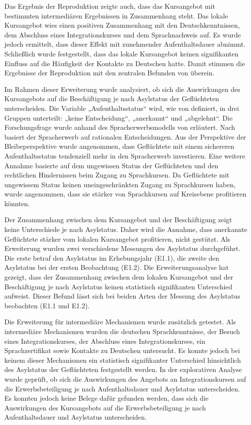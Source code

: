  Das Ergebnis der Reproduktion zeigte auch, dass das Kursangebot mit bestimmten intermediären Ergebnissen in Zusammenhang steht. Das lokale Kursangebot wies einen positiven Zusammenhang mit den Deutschkenntnissen, dem Abschluss eines Integrationskurses und dem Sprachnachweis auf. Es wurde jedoch ermittelt, dass dieser Effekt mit zunehmender Aufenthaltsdauer abnimmt. Schließlich wurde festgestellt, dass das lokale Kursangebot keinen signifikanten Einfluss auf die Häufigkeit der Kontakte zu Deutschen hatte. Damit stimmen die Ergebnisse der Reproduktion mit den zentralen Befunden von \textcite{Kanas:2023} überein.
 
 Im Rahmen dieser Erweiterung wurde analysiert, ob sich die Auswirkungen des Kursangebots auf die Beschäftigung je nach Asylstatus der Geflüchteten unterscheiden. Die Variable „Aufenthaltsstatus“ wird, wie von \textcite{Kanas:2023} definiert, in drei Gruppen unterteilt: „keine Entscheidung“, „anerkannt“ und „abgelehnt“. Die Forschungsfrage wurde anhand des Spracherwerbsmodells von \textcite{Esser:2006} erläutert. Nach \textcite{Esser:2006} basiert der Spracherwerb auf rationalen Entscheidungen. Aus der Perspektive der Bleibeperspektive wurde angenommen, dass Geflüchtete mit einem sichereren Aufenthaltsstatus tendenziell mehr in den Spracherwerb investieren. Eine weitere Annahme basierte auf dem ungewissen Status der Geflüchteten und den rechtlichen Hindernissen beim Zugang zu Sprachkursen. Da Geflüchtete mit ungewissem Status keinen uneingeschränkten Zugang zu Sprachkursen haben, wurde angenommen, dass sie stärker von Sprachkursen auf Kreisebene profitieren könnten.
 
 Der Zusammenhang zwischen dem Kursangebot und der Beschäftigung zeigt keine Unterschiede je nach Asylstatus. Daher wird die Annahme, dass anerkannte Geflüchtete stärker vom lokalen Kursangebot profitieren, nicht gestützt. Als Erweiterung wurden zwei verschiedene Messungen des Asylstatus durchgeführt. Die erste betraf den Asylstatus im Erhebungsjahr (E1.1), die zweite den Asylstatus bei der ersten Beobachtung (E1.2). Die Erweiterungsanalyse hat gezeigt, dass der Zusammenhang zwischen dem lokalen Kursangebot und der Beschäftigung je nach Asylstatus keinen statistisch signifikanten Unterschied aufweist. Dieser Befund lässt sich bei beiden Arten der Messung des Asylstatus beobachten (E1.1 und E1.2).
 
 Die Erweiterung für intermediäre Mechanismen wurde zusätzlich getestet. Als intermediäre Mechanismen wurden die deutschen Sprachkenntnisse, der Besuch eines Integrationskurses, der Abschluss eines Integrationskurses, ein Sprachzertifikat sowie Kontakte zu Deutschen untersucht. Es konnte jedoch bei keinem dieser Mechanismen ein statistisch signifikanter Unterschied hinsichtlich des Asylstatus der Geflüchteten festgestellt werden. In der explorativen Analyse wurde geprüft, ob sich die Auswirkungen des Angebots an Integrationskursen auf die Erwerbsbeteiligung je nach Aufenthaltsdauer und Asylstatus unterscheiden. Es konnten jedoch keine Belege dafür gefunden werden, dass sich die Auswirkungen des Kursangebots auf die Erwerbsbeteiligung je nach Aufenthaltsdauer und Asylstatus unterscheiden.
 
